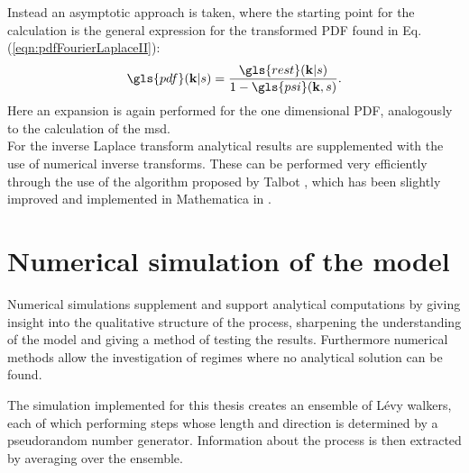 Instead an asymptotic approach is taken, where the starting point for the calculation is the general expression for the transformed \gls{PDF} found in  Eq. (\ref{eqn:pdfFourierLaplaceII}):
%
\begin{align}
\gls{pdf}(\ve{k}|s) = \frac{ \gls{rest}(\ve{k}|s)}{1 - \gls{psi}(\ve{k},s)}  .
\end{align}
%
Here an expansion is again performed for the one dimensional PDF, analogously to the calculation of the \gls{msd}. \\
For the inverse Laplace transform analytical results are supplemented with the use of numerical inverse transforms. These can be performed very efficiently through the use of the algorithm proposed by Talbot 
\cite{talbot1979}, 
which has been slightly improved and implemented in Mathematica in 
\cite{abate2004}.


\section{Numerical simulation of the model}

Numerical simulations supplement and support analytical computations by giving insight into the qualitative structure of the process, sharpening the understanding of the model and giving a method of testing the results. Furthermore numerical methods allow the investigation of regimes where no analytical solution can be found.

The simulation implemented for this thesis creates an ensemble of L\'evy walkers, each of which performing steps whose length and direction is determined by a pseudorandom number generator. Information about the process is then extracted by averaging over the ensemble. 

